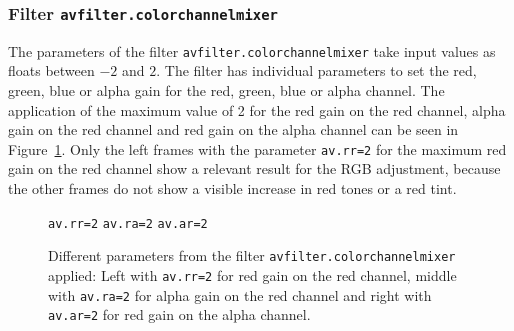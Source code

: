 \documentclass[../MasterThesis.tex]{subfiles}
\begin{document}

\subsubsection*{Filter \texttt{avfilter.colorchannelmixer}}

The parameters of the filter \texttt{avfilter.colorchannelmixer} take input values as floats between $-2$ and $2$. The filter has individual parameters to set the red, green, blue or alpha gain for the red, green, blue or alpha channel. The application of the maximum value of 2 for the red gain on the red channel, alpha gain on the red channel and red gain on the alpha channel can be seen in Figure~\ref{figure:rrraar}.
%
Only the left frames with the parameter \texttt{av.rr=2} for the maximum red gain on the red channel show a relevant result for the RGB adjustment, because the other frames do not show a visible increase in red tones or a red tint.

\begin{figure}[H]
	\begin{center}
		\small{
			\texttt{av.rr=2} \hspace*{0.22\textwidth} \texttt{av.ra=2} \hspace*{0.23\textwidth} \texttt{av.ar=2}}
		\caption[Different parameters from \texttt{avfilter.colorchannelmixer} applied.]{Different parameters from the filter \texttt{avfilter.colorchannelmixer} applied: Left with \texttt{av.rr=2} for red gain on the red channel, middle with \texttt{av.ra=2} for alpha gain on the red channel and right with \texttt{av.ar=2} for red gain on the alpha channel.}
		\label{figure:rrraar}
	\end{center}
\end{figure}
\end{document}
